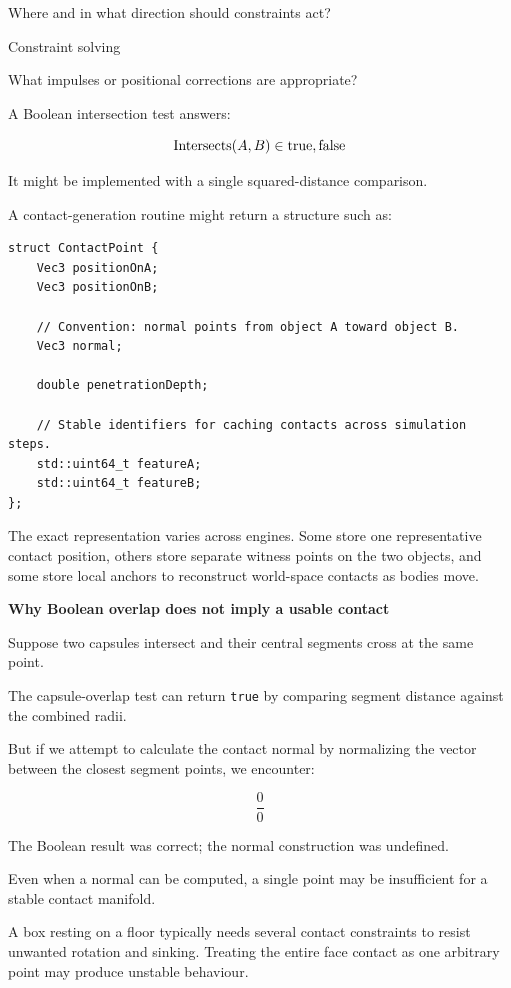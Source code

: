 Where and in what direction should constraints act?

Constraint solving

What impulses or positional corrections are appropriate?

A Boolean intersection test answers:

\[
\operatorname{Intersects}(A,B)\in\\{\mathrm{true},\mathrm{false}\\}
\]

It might be implemented with a single squared-distance comparison.

A contact-generation routine might return a structure such as:

\begin{verbatim}
struct ContactPoint {
    Vec3 positionOnA;
    Vec3 positionOnB;

    // Convention: normal points from object A toward object B.
    Vec3 normal;

    double penetrationDepth;

    // Stable identifiers for caching contacts across simulation steps.
    std::uint64_t featureA;
    std::uint64_t featureB;
};
\end{verbatim}

The exact representation varies across engines. Some store one representative contact position, others store separate witness points on the two objects, and some store local anchors to reconstruct world-space contacts as bodies move.

\textbf{Why Boolean overlap does not imply a usable contact}

Suppose two capsules intersect and their central segments cross at the same point.

The capsule-overlap test can return \texttt{true} by comparing segment distance against the combined radii.

But if we attempt to calculate the contact normal by normalizing the vector between the closest segment points, we encounter:

\[
\frac{0}{0}
\]

The Boolean result was correct; the normal construction was undefined.

Even when a normal can be computed, a single point may be insufficient for a stable contact manifold.

A box resting on a floor typically needs several contact constraints to resist unwanted rotation and sinking. Treating the entire face contact as one arbitrary point may produce unstable behaviour.

